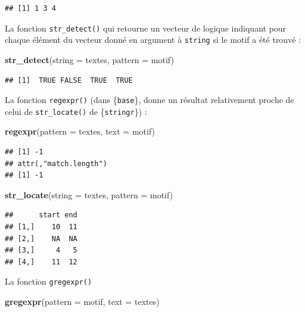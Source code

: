 \documentclass[
  11pt,
]{book}
\newenvironment{Shaded}{\begin{snugshade}}{\end{snugshade}}
\newcommand{\DataTypeTok}[1]{\textcolor[rgb]{0.13,0.29,0.53}{#1}}
\newcommand{\KeywordTok}[1]{\textcolor[rgb]{0.13,0.29,0.53}{\textbf{#1}}}
\newcommand{\NormalTok}[1]{#1}
\numberwithin{equation}{section}
\numberwithin{countremarque}{section}
\begin{document}
\begin{lstlisting}
## [1] 1 3 4
\end{lstlisting}

La fonction \texttt{str\_detect()} qui retourne un vecteur de logique indiquant pour chaque élément du vecteur donné en argument à \texttt{string} si le motif a été trouvé :

\begin{Shaded}
\begin{Highlighting}[]
\KeywordTok{str\_detect}\NormalTok{(}\DataTypeTok{string =}\NormalTok{ textes, }\DataTypeTok{pattern =}\NormalTok{ motif)}
\end{Highlighting}
\end{Shaded}

\begin{lstlisting}
## [1]  TRUE FALSE  TRUE  TRUE
\end{lstlisting}

La fonction \texttt{regexpr()} (dans \{\texttt{base}\}, donne un résultat relativement proche de celui de \texttt{str\_locate()} de \{\texttt{stringr}\}) :

\begin{Shaded}
\begin{Highlighting}[]
\KeywordTok{regexpr}\NormalTok{(}\DataTypeTok{pattern =}\NormalTok{ textes, }\DataTypeTok{text =}\NormalTok{ motif)}
\end{Highlighting}
\end{Shaded}

\begin{lstlisting}
## [1] -1
## attr(,"match.length")
## [1] -1
\end{lstlisting}

\begin{Shaded}
\begin{Highlighting}[]
\KeywordTok{str\_locate}\NormalTok{(}\DataTypeTok{string =}\NormalTok{ textes, }\DataTypeTok{pattern =}\NormalTok{ motif)}
\end{Highlighting}
\end{Shaded}

\begin{lstlisting}
##      start end
## [1,]    10  11
## [2,]    NA  NA
## [3,]     4   5
## [4,]    11  12
\end{lstlisting}

La fonction \texttt{gregexpr()}

\begin{Shaded}
\begin{Highlighting}[]
\KeywordTok{gregexpr}\NormalTok{(}\DataTypeTok{pattern =}\NormalTok{ motif, }\DataTypeTok{text =}\NormalTok{ textes)}
\end{Highlighting}
\end{Shaded}
\end{document}
